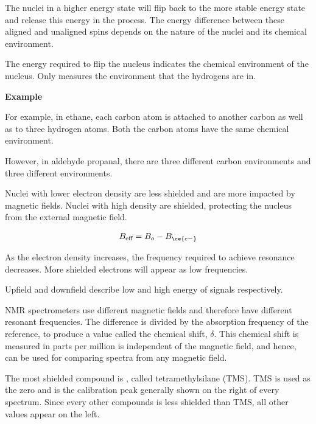 	The nuclei in a higher energy state will flip back to the more stable energy state and release this energy in the process. The energy difference between these aligned and unaligned spins depends on the nature of the nuclei and its chemical environment.

	The energy required to flip the nucleus indicates the chemical environment of the nucleus. Only measures the environment that the hydrogens are in.

	\textbf{Example}
	
	For example, in ethane, each carbon atom is attached to another carbon as well as to three hydrogen atoms. Both the carbon atoms have the same chemical environment.

	\begin{center}
	\end{center}

	However, in aldehyde propanal, there are three different carbon environments and three different  environments.

	\begin{center}
	\end{center}

	Nuclei with lower electron density are less shielded and are more impacted by magnetic fields. Nuclei with high density are shielded, protecting the nucleus from the external magnetic field.

	\begin{align*}
		B_{\text{eff}} = B_o - B_{\ce{e-}}
	\end{align*}

	As the electron density increases, the frequency required to achieve resonance decreases. More shielded electrons will appear as low frequencies.

	Upfield and downfield describe low and high energy of signals respectively.
	
	NMR spectrometers use different magnetic fields and therefore have different resonant frequencies. The difference is divided by the absorption frequency of the reference, to produce a value called the chemical shift, $\delta$. This chemical shift is measured in parts per million is independent of the magnetic field, and hence, can be used for comparing spectra from any magnetic field.

	The most shielded compound is , called tetramethylsilane (TMS). TMS is used as the zero and is the calibration peak generally shown on the right of every spectrum. Since every other compounds is less shielded than TMS, all other values appear on the left.

